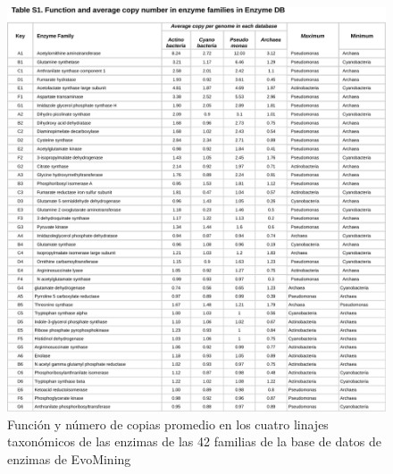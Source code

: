 \documentclass[12pt,twoside]{reedthesis}
\begin{document}
  \begin{figure}[h!tbp]
  \centering
  \includegraphics[angle = 0,scale = .8]{Anexos/Tabla42.pdf}
  \caption[Expansiones de las 42 enzimas en los cuatro linajes genómicos]{\footnotesize{Función y número de copias promedio en los cuatro linajes taxonómicos de las enzimas de las 42 familias de la base de datos de enzimas de EvoMining}}
  \label{fig:DataTabla42}
  \end{figure}
  
\end{document}
